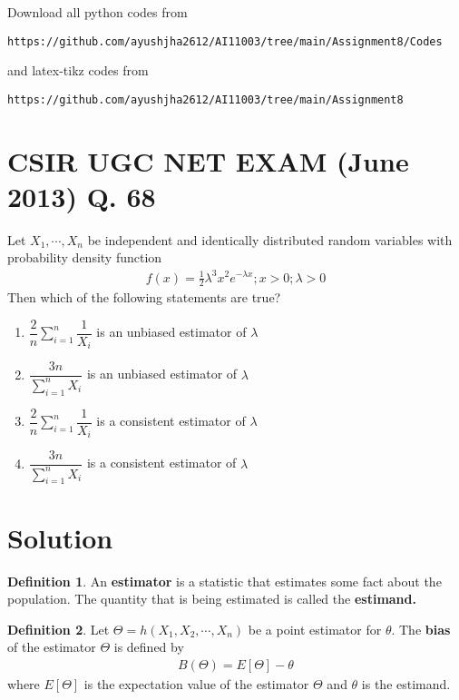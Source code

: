 \documentclass[journal,12pt,twocolumn]{IEEEtran}
\theoremstyle{definition}
\newtheorem{definition}{Definition}[section]
\begin{document}
\author{Name : Ayush Jha \\ Roll Number: CS20BTECH11006}
\maketitle
\newpage
\bigskip
\renewcommand{\thefigure}{\theenumi}
\renewcommand{\thetable}{\theenumi}
Download all python codes from 
\begin{lstlisting}
https://github.com/ayushjha2612/AI11003/tree/main/Assignment8/Codes
\end{lstlisting}
%
and latex-tikz codes from 
%
\begin{lstlisting}
https://github.com/ayushjha2612/AI11003/tree/main/Assignment8
\end{lstlisting}

\section*{CSIR UGC NET EXAM (June 2013) Q. 68}
Let $ X_1, \cdots , X_n $ be independent and identically distributed random variables with probability density function
\begin{align}
    f(x) = \frac{1}{2} \lambda^3x^2e^{-\lambda x} ; x>0 ; \lambda > 0
    \label{pdf}
\end{align}
Then which of the following statements are true?
\begin{enumerate}
    \item $\dfrac{2}{n} \sum_{i=1}^{n} \dfrac{1}{X_i} $ is an unbiased estimator of $ \lambda$
    \item $\dfrac{3n}{\sum_{i=1}^{n} X_i } $ is an unbiased estimator of $ \lambda$ \\
    \item $\dfrac{2}{n} \sum_{i=1}^{n} \dfrac{1}{X_i} $ is a consistent estimator of $ \lambda$
    \item $\dfrac{3n}{\sum_{i=1}^{n} X_i } $ is a consistent estimator of $ \lambda$
\end{enumerate}

\section*{Solution}
\begin{definition}
An \textbf{estimator} is a statistic that estimates some fact about the population.
The quantity that is being estimated is called the \textbf{estimand.} 
\end{definition}
\begin{definition}
Let $ \Theta = h(X_1,X_2, \cdots, X_n) $  be a point estimator for $ \theta$. The \textbf{bias} of the estimator $ \Theta $ is defined by 
\begin{align}
    B(\Theta ) = E[\Theta ] - \theta
\end{align}
where $ E[\Theta ]$ is the expectation value of the estimator $ \Theta $ and $ \theta$ is the estimand.
\end{definition}
\end{document}
